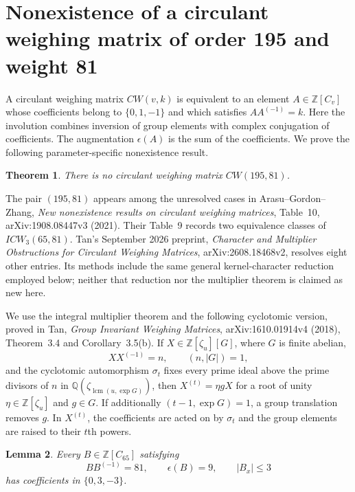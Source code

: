 \documentclass[11pt]{article}
\newtheorem{theorem}{Theorem}[section]
\newtheorem{lemma}[theorem]{Lemma}
\theoremstyle{remark}
\numberwithin{equation}{section}
\begin{document}
\section{Nonexistence of a circulant weighing matrix of order 195 and weight 81}
\label{sec:cw195}

A circulant weighing matrix $CW(v,k)$ is equivalent to an element
$A\in\mathbb Z[C_v]$ whose coefficients belong to $\{0,1,-1\}$ and which
satisfies $AA^{(-1)}=k$. Here the involution combines inversion of group
elements with complex conjugation of coefficients. The augmentation
$\epsilon(A)$ is the sum of the coefficients. We prove the following
parameter-specific nonexistence result.

\begin{theorem}\label{thm:cw195}
There is no circulant weighing matrix $CW(195,81)$.
\end{theorem}

The pair $(195,81)$ appears among the unresolved cases in
Arasu--Gordon--Zhang, \emph{New nonexistence results on circulant weighing
matrices}, Table~10, arXiv:1908.08447v3 (2021). Their Table~9 records two
equivalence classes of $ICW_3(65,81)$. Tan's September 2026 preprint,
\emph{Character and Multiplier Obstructions for Circulant Weighing Matrices},
arXiv:2608.18468v2, resolves eight other entries. Its methods include the
same general kernel-character reduction employed below; neither that
reduction nor the multiplier theorem is claimed as new here.

We use the integral multiplier theorem and the following cyclotomic version,
proved in Tan, \emph{Group Invariant Weighing Matrices},
arXiv:1610.01914v4 (2018), Theorem~3.4 and Corollary~3.5(b).
If $X\in\mathbb Z[\zeta_u][G]$, where $G$ is finite abelian,
\[
 XX^{(-1)}=n,\qquad (n,|G|)=1,
\]
and the cyclotomic automorphism $\sigma_t$ fixes every prime ideal above
the prime divisors of $n$ in $\mathbb Q(\zeta_{\operatorname{lcm}(u,\exp G)})$,
then $X^{(t)}=\eta gX$ for a root of unity $\eta\in\mathbb Z[\zeta_u]$
and $g\in G$. If additionally $(t-1,\exp G)=1$, a group translation
removes $g$. In $X^{(t)}$, the coefficients are acted on by $\sigma_t$
and the group elements are raised to their $t$th powers.

\begin{lemma}\label{lem:icw65-divisible}
Every $B\in\mathbb Z[C_{65}]$ satisfying
\[
 BB^{(-1)}=81,\qquad \epsilon(B)=9,
 \qquad |B_x|\le3
\]
has coefficients in $\{0,3,-3\}$.
\end{lemma}
\end{document}
